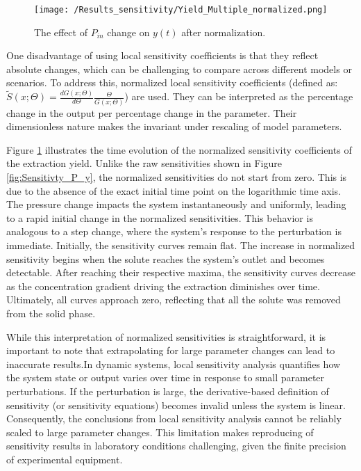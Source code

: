 \documentclass[a4paper,fleqn]{cas-dc}
\begin{document}
	\begin{figure}[!hb]
		\centering
		\texttt{[image: /Results\_sensitivity/Yield\_Multiple\_normalized.png]}
		\caption{The effect of $P_{in}$ change on $y(t)$ after normalization.}
		\label{fig:Sensitivty_P_y_norm}
	\end{figure}
	
	One disadvantage of using local sensitivity coefficients is that they reflect absolute changes, which can be challenging to compare across different models or scenarios. To address this, normalized local sensitivity coefficients (defined as: $\tilde{S}(x;\Theta) = \frac{d G(x;\Theta)}{d\Theta} \frac{\Theta}{G(x;\Theta)}$) are used. They can be interpreted as the percentage change in the output per percentage change in the parameter. Their dimensionless nature makes the invariant under rescaling of model parameters.
		
	Figure \ref{fig:Sensitivty_P_y_norm} illustrates the time evolution of the normalized sensitivity coefficients of the extraction yield. Unlike the raw sensitivities shown in Figure \ref{fig:Sensitivty_P_y}, the normalized sensitivities do not start from zero. This is due to the absence of the exact initial time point on the logarithmic time axis. The pressure change impacts the system instantaneously and uniformly, leading to a rapid initial change in the normalized sensitivities. This behavior is analogous to a step change, where the system's response to the perturbation is immediate. Initially, the sensitivity curves remain flat. The increase in normalized sensitivity begins when the solute reaches the system's outlet and becomes detectable. After reaching their respective maxima, the sensitivity curves decrease as the concentration gradient driving the extraction diminishes over time. Ultimately, all curves approach zero, reflecting that all the solute was removed from the solid phase.
	
	While this interpretation of normalized sensitivities is straightforward, it is important to note that extrapolating for large parameter changes can lead to inaccurate results.In dynamic systems, local sensitivity analysis quantifies how the system state or output varies over time in response to small parameter perturbations. If the perturbation is large, the derivative-based definition of sensitivity (or sensitivity equations) becomes invalid unless the system is linear. Consequently, the conclusions from local sensitivity analysis cannot be reliably scaled to large parameter changes. This limitation makes reproducing of sensitivity results in laboratory conditions challenging, given the finite precision of experimental equipment.
	
\end{document}
